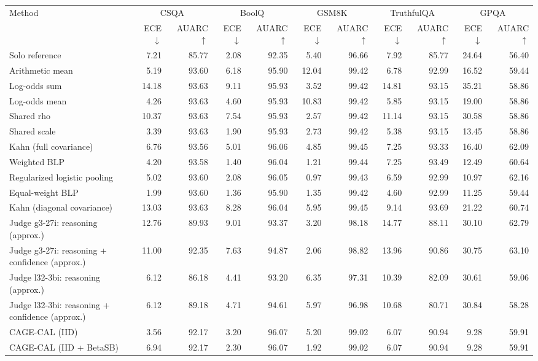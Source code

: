 \begin{tabular}{lrrrrrrrrrr}
\toprule
Method & \multicolumn{2}{c}{CSQA} & \multicolumn{2}{c}{BoolQ} & \multicolumn{2}{c}{GSM8K} & \multicolumn{2}{c}{TruthfulQA} & \multicolumn{2}{c}{GPQA} \\
 & ECE $\downarrow$ & AUARC $\uparrow$ & ECE $\downarrow$ & AUARC $\uparrow$ & ECE $\downarrow$ & AUARC $\uparrow$ & ECE $\downarrow$ & AUARC $\uparrow$ & ECE $\downarrow$ & AUARC $\uparrow$ \\
\midrule
Solo reference & 7.21 & 85.77 & 2.08 & 92.35 & 5.40 & 96.66 & 7.92 & 85.77 & 24.64 & 56.40 \\
Arithmetic mean & 5.19 & 93.60 & 6.18 & 95.90 & 12.04 & 99.42 & 6.78 & 92.99 & 16.52 & 59.44 \\
Log-odds sum & 14.18 & 93.63 & 9.11 & 95.93 & 3.52 & 99.42 & 14.81 & 93.15 & 35.21 & 58.86 \\
Log-odds mean & 4.26 & 93.63 & 4.60 & 95.93 & 10.83 & 99.42 & 5.85 & 93.15 & 19.00 & 58.86 \\
Shared rho & 10.37 & 93.63 & 7.54 & 95.93 & 2.57 & 99.42 & 11.14 & 93.15 & 30.58 & 58.86 \\
Shared scale & 3.39 & 93.63 & 1.90 & 95.93 & 2.73 & 99.42 & 5.38 & 93.15 & 13.45 & 58.86 \\
Kahn (full covariance) & 6.76 & 93.56 & 5.01 & 96.06 & 4.85 & 99.45 & 7.25 & 93.33 & 16.40 & 62.09 \\
Weighted BLP & 4.20 & 93.58 & 1.40 & 96.04 & 1.21 & 99.44 & 7.25 & 93.49 & 12.49 & 60.64 \\
Regularized logistic pooling & 5.02 & 93.60 & 2.08 & 96.05 & 0.97 & 99.43 & 6.59 & 92.99 & 10.97 & 62.16 \\
Equal-weight BLP & 1.99 & 93.60 & 1.36 & 95.90 & 1.35 & 99.42 & 4.60 & 92.99 & 11.25 & 59.44 \\
Kahn (diagonal covariance) & 13.03 & 93.63 & 8.28 & 96.04 & 5.95 & 99.45 & 9.14 & 93.69 & 21.22 & 60.74 \\
Judge g3-27i: reasoning (approx.) & 12.76 & 89.93 & 9.01 & 93.37 & 3.20 & 98.18 & 14.77 & 88.11 & 30.10 & 62.79 \\
Judge g3-27i: reasoning + confidence (approx.) & 11.00 & 92.35 & 7.63 & 94.87 & 2.06 & 98.82 & 13.96 & 90.86 & 30.75 & 63.10 \\
Judge l32-3bi: reasoning (approx.) & 6.12 & 86.18 & 4.41 & 93.20 & 6.35 & 97.31 & 10.39 & 82.09 & 30.61 & 59.06 \\
Judge l32-3bi: reasoning + confidence (approx.) & 6.12 & 89.18 & 4.71 & 94.61 & 5.97 & 96.98 & 10.68 & 80.71 & 30.84 & 58.28 \\
CAGE-CAL (IID) & 3.56 & 92.17 & 3.20 & 96.07 & 5.20 & 99.02 & 6.07 & 90.94 & 9.28 & 59.91 \\
CAGE-CAL (IID + BetaSB) & 6.94 & 92.17 & 2.30 & 96.07 & 1.92 & 99.02 & 6.07 & 90.94 & 9.28 & 59.91 \\
\bottomrule
\end{tabular}
